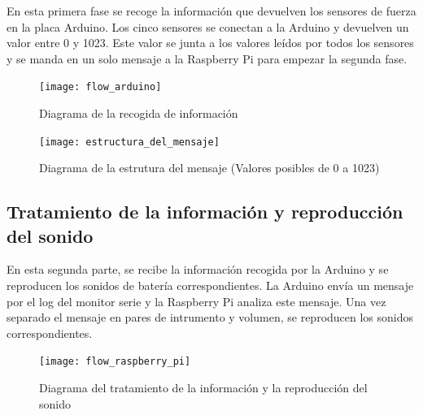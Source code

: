             En esta primera fase se recoge la información que devuelven los sensores de fuerza en la placa Arduino. Los
            cinco sensores se conectan a la Arduino y devuelven un valor entre 0 y 1023. Este valor se junta a los
            valores leídos por todos los sensores y se manda en un solo mensaje a la Raspberry Pi para empezar la
            segunda fase.

            \newpage

            \begin{figure}[ht]
                \centering
                \texttt{[image: flow\_arduino]}
                \caption{Diagrama de la recogida de información \label{fig:DiagramaRecogida}}
            \end{figure}

            \newline

            \begin{figure}[ht]
                \centering
                \texttt{[image: estructura\_del\_mensaje]}
                \caption{Diagrama de la estrutura del mensaje (Valores posibles de 0 a
                1023) \label{fig:DiagramaEstrutura}}
            \end{figure}


        \subsection{Tratamiento de la información y reproducción del sonido} %
        \label{sub:TratamientoDeLaInformacionYReproduccionDelSonido}

            En esta segunda parte, se recibe la información recogida por la Arduino y se reproducen los sonidos de
            batería correspondientes. La Arduino envía un mensaje por el log del monitor serie y la Raspberry Pi analiza
            este mensaje. Una vez separado el mensaje en pares de intrumento y volumen, se reproducen los sonidos
            correspondientes.

            \begin{figure}[ht]
                \centering
                \texttt{[image: flow\_raspberry\_pi]}
                \caption{Diagrama del tratamiento de la información y la reproducción del
                sonido \label{fig:DiagramaTratamiento}}
            \end{figure}

